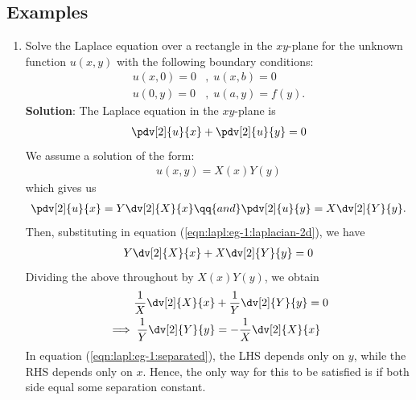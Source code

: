     \subsection*{Examples}
        \begin{enumerate}
            \setcounter{equation}{0}
            \item Solve the Laplace equation over a rectangle in the $xy$-plane for the unknown function $u(x,y)$ with the following boundary conditions:
            \begin{align*}
                u(x,0)=0&,\;u(x,b)=0 \\
                u(0,y)=0&,\;u(a,y)=f(y).
            \end{align*}
            \textbf{Solution}: The Laplace equation in the $xy$-plane is
            \begin{align}
                \pdv[2]{u}{x}+\pdv[2]{u}{y}=0 \label{eqn:lapl:eg-1:laplacian-2d}
            \end{align}
            We assume a solution of the form:
            \begin{align}
                u(x,y)=X(x)Y(y) \label{eqn:lapl:eg-1:asm-soln}
            \end{align}
            which gives us
            \begin{align*}
                \pdv[2]{u}{x}=Y\dv[2]{X}{x}\qq{and}\pdv[2]{u}{y}=X\dv[2]{Y}{y}.
            \end{align*}
            Then, substituting in equation (\ref{eqn:lapl:eg-1:laplacian-2d}), we have
            \begin{align*}
                Y\dv[2]{X}{x}+X\dv[2]{Y}{y}=0
            \end{align*}
            Dividing the above throughout by $X(x)Y(y)$, we obtain
            \begin{align}
                \dfrac{1}{X}\dv[2]{X}{x}&+\dfrac{1}{Y}\dv[2]{Y}{y}=0 \nonumber\\
                \implies\dfrac{1}{Y}\dv[2]{Y}{y}&=-\dfrac{1}{X}\dv[2]{X}{x} \label{eqn:lapl:eg-1:separated}
            \end{align}
            In equation (\ref{eqn:lapl:eg-1:separated}), the LHS depends only on $y$, while the RHS depends only on $x$. Hence, the only way for this to be satisfied is if both side equal some separation constant.


\end{enumerate}

